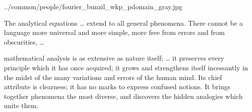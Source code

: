 

  {../common/people/fourier_bunzil_wkp_pdomain_gray.jpg}
  {%
  The analytical equations
  \ldots
  extend to all general phenomena. 
  There cannot be a language more universal and more simple, 
  more free from errors and from obscurities, 
  \ldots
  
  mathematical analysis is as extensive as nature itself; 
  \ldots
  it preserves every principle which it has once acquired; 
  it grows and strengthens itself incessantly in the midst of the many variations and errors of the human mind. 
  Its chief attribute is clearness; it has no marks to express confused notions. 
  It brings together phenomena the most diverse, and discovers the hidden analogies which unite them.
  }
%
  
%  
%  
%  
%  
%  


